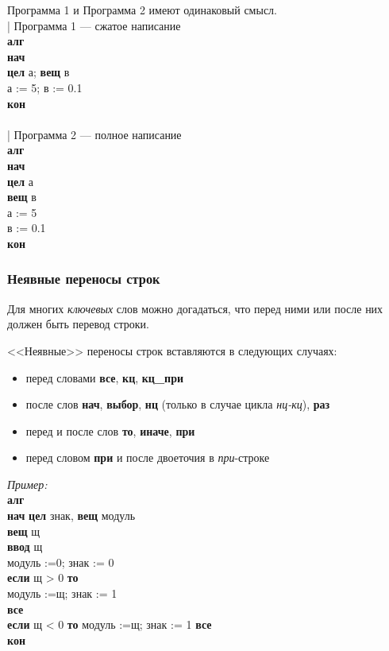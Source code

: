Программа 1 и Программа 2 имеют одинаковый смысл.\\
{\sffamily
| Программа 1 --- сжатое написание\\
\textbf{алг}\\
\textbf{нач}\\
\otstup \textbf{цел} а; \textbf{вещ} в\\
\otstup а := 5; в := 0.1\\
\textbf{кон} \\
~\\
| Программа 2 --- полное написание\\
\textbf{алг}\\
\textbf{нач}\\
\otstup \textbf{цел} а\\
\otstup \textbf{вещ} в\\
\otstup а := 5\\
\otstup в := 0.1\\
\textbf{кон}
}

\subsubsection{Неявные переносы строк}

Для многих \emph{ключевых} слов можно догадаться, что перед ними или после них должен быть перевод строки.

<<Неявные>> переносы строк вставляются в следующих случаях:
\begin{itemize}
\item перед словами \textbf{все}, \textbf{кц}, \textbf{кц\_при}
\item после слов \textbf{нач}, \textbf{выбор}, \textbf{нц} (только в случае цикла \emph{нц-кц}), \textbf{раз}
\item перед и после слов \textbf{то}, \textbf{иначе}, \textbf{при}
\item перед словом \textbf{при} и после двоеточия в \emph{при}-строке
\end{itemize}

\emph{Пример:}\\
{\sffamily
\textbf{алг}\\
\textbf{нач} \textbf{цел} знак, \textbf{вещ} модуль\\
\otstup \textbf{вещ} щ\\
\otstup \textbf{ввод} щ\\
\otstup модуль :=0; знак := 0\\
\otstup \textbf{если} щ > 0 \textbf{то}\\
\otstup \otstup модуль :=щ; знак := 1\\
\otstup \textbf{все}\\
\otstup \textbf{если} щ < 0 \textbf{то} модуль :=щ; знак := 1 \textbf{все}\\
\textbf{кон}
}

